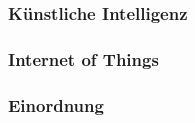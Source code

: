 
\subsubsection{Künstliche Intelligenz}


\subsubsection{Internet of Things}

\subsubsection{Einordnung}


